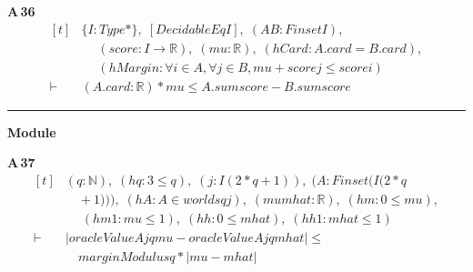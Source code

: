 \noindent\textbf{A\,36}\quad{}
{\footnotesize\[ \begin{aligned}[t]
&\{ \mathit{I} : \mathit{Type}*\},\; [\mathit{DecidableEq} \mathit{I}],\; (\mathit{A} \mathit{B} : \mathit{Finset} \mathit{I}),\\
&\quad \; (\mathit{score} : \mathit{I} \to \mathbb{R} ),\; (\mathit{mu} : \mathbb{R} ),\; (\mathit{hCard} : \mathit{A}.\mathit{card} = \mathit{B}.\mathit{card}),\\
&\quad \; (\mathit{hMargin} : \forall \mathit{i} \in \mathit{A}, \forall \mathit{j} \in \mathit{B}, \mathit{mu} + \mathit{score} \mathit{j} \leq \mathit{score} \mathit{i})\\
\vdash\;&(\mathit{A}.\mathit{card} : \mathbb{R} ) * \mathit{mu} \leq \mathit{A}.\mathit{sum} \mathit{score} - \mathit{B}.\mathit{sum} \mathit{score}
\end{aligned} \]}

\vspace{4pt}\noindent\rule{\columnwidth}{0.4pt}\par\vspace{2pt}
\noindent\textbf{Module }\par\vspace{3pt}

\noindent\textbf{A\,37}\quad{}
{\footnotesize\[ \begin{aligned}[t]
&(\mathit{q} : \mathbb{N} ),\; (\mathit{hq} : 3 \leq \mathit{q}),\; (\mathit{j} : \mathit{I} (2*\mathit{q}+1)),\; (\mathit{A} : \mathit{Finset} (\mathit{I} (2*\mathit{q}\\
&\quad +1))),\; (\mathit{hA} : \mathit{A} \in \mathit{worlds} \mathit{q} \mathit{j}),\; (\mathit{mu} \mathit{mhat} : \mathbb{R} ),\; (\mathit{hm} : 0 \leq \mathit{mu}),\\
&\quad \; (\mathit{hm1} : \mathit{mu} \leq 1),\; (\mathit{hh} : 0 \leq \mathit{mhat}),\; (\mathit{hh1} : \mathit{mhat} \leq 1)\\
\vdash\;&|\mathit{oracleValue} \mathit{A} \mathit{j} \mathit{q} \mathit{mu}-\mathit{oracleValue} \mathit{A} \mathit{j} \mathit{q} \mathit{mhat}| \leq\\
&\quad \mathit{marginModulus} \mathit{q}*|\mathit{mu}-\mathit{mhat}|
\end{aligned} \]}

